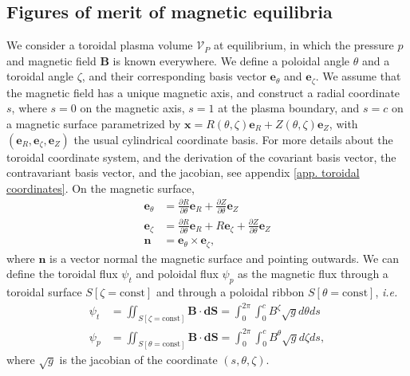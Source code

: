 \documentclass[my_thesis.tex]{subfiles}
\begin{document}
\subsection{Figures of merit of magnetic equilibria}
We consider a toroidal plasma volume $\mathcal{V}_P$ at equilibrium, in which the pressure $p$ and magnetic field $\mathbf{B}$ is known everywhere. We define a poloidal angle $\theta$ and a toroidal angle $\zeta$, and their corresponding basis vector $\mathbf{e}_\theta$ and $\mathbf{e}_\zeta$. We assume that the magnetic field has a unique magnetic axis, and construct a radial coordinate $s$, where $s=0$ on the magnetic axis, $s=1$ at the plasma boundary, and $s=c$ on a magnetic surface parametrized by $\mathbf{x}=R(\theta,\zeta)\mathbf{e}_R + Z(\theta,\zeta)\mathbf{e}_Z$, with $(\mathbf{e}_R,\mathbf{e}_\zeta,\mathbf{e}_Z)$ the usual cylindrical coordinate basis. For more details about the toroidal coordinate system, and the derivation of the covariant basis vector, the contravariant basis vector, and the jacobian, see appendix \ref{app. toroidal coordinates}. On the magnetic surface, 
\begin{align}
	\mathbf{e}_\theta &= \frac{\partial R}{\partial \theta}\mathbf{e}_R + \frac{\partial Z}{\partial \theta}\mathbf{e}_Z\\
	\mathbf{e}_\zeta &= \frac{\partial R}{\partial \theta}\mathbf{e}_R + R\mathbf{e}_\zeta + \frac{\partial Z}{\partial \theta}\mathbf{e}_Z\\
	\mathbf{n} &= \mathbf{e}_\theta\times\mathbf{e}_\zeta,
\end{align}
where $\mathbf{n}$ is a vector normal the magnetic surface and pointing outwards. We can define the toroidal flux $\psi_t$ and poloidal flux $\psi_p$ as the magnetic flux through a toroidal surface $S[\zeta=\text{const}]$ and through a poloidal ribbon $S[\theta=\text{const}]$, \textit{i.e.}
\begin{align}
	\psi_t &= \iint_{S[\zeta=\text{const}]} \mathbf{B}\cdot \mathbf{dS} = \int_0^{2\pi}\int_0^c B^\zeta \sqrt{g}d\theta ds\\
	\psi_p &= \iint_{S[\theta=\text{const}]} \mathbf{B}\cdot \mathbf{dS} = \int_0^{2\pi}\int_0^c B^\theta \sqrt{g}d\zeta ds,
\end{align}
where $\sqrt{g}$ is the jacobian of the coordinate $(s,\theta,\zeta)$. 
\end{document}

